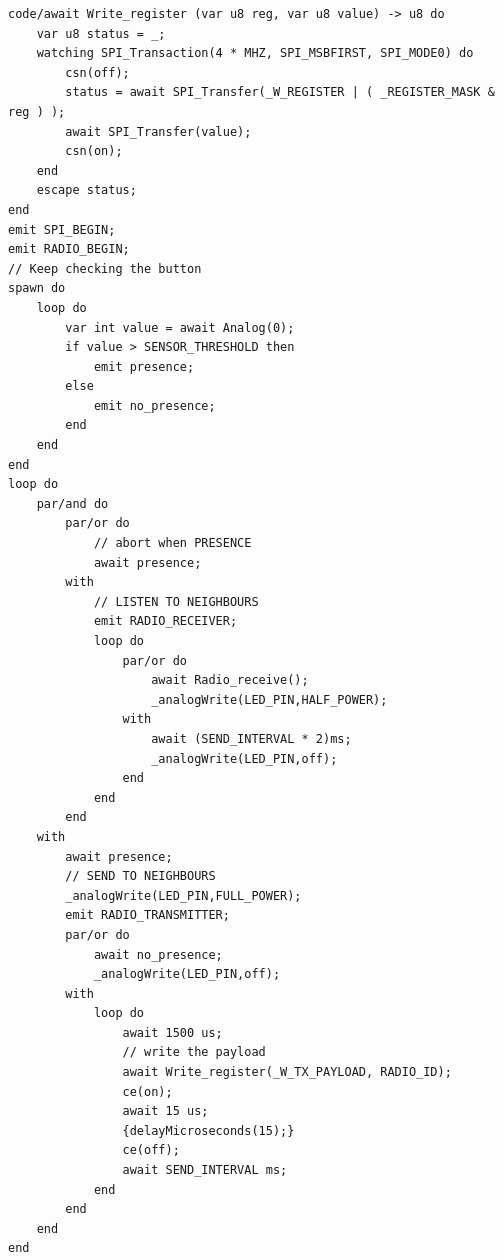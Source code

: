 \documentclass[11pt]{article}
\begin{document}
\begin{lstlisting}[style=CStyle,label=spi-ceu-abstraction-final,caption=Aplicação utilizando driver SPI em Céu com abstrações]
code/await Write_register (var u8 reg, var u8 value) -> u8 do
    var u8 status = _;
    watching SPI_Transaction(4 * MHZ, SPI_MSBFIRST, SPI_MODE0) do
        csn(off);
        status = await SPI_Transfer(_W_REGISTER | ( _REGISTER_MASK & reg ) ); 
        await SPI_Transfer(value);
        csn(on);
    end
    escape status;
end
emit SPI_BEGIN;
emit RADIO_BEGIN;
// Keep checking the button
spawn do
    loop do
        var int value = await Analog(0);
        if value > SENSOR_THRESHOLD then
            emit presence;
        else
            emit no_presence;
        end
    end
end
loop do
    par/and do
        par/or do
            // abort when PRESENCE
            await presence;
        with
            // LISTEN TO NEIGHBOURS
            emit RADIO_RECEIVER;
            loop do
                par/or do
                    await Radio_receive();
                    _analogWrite(LED_PIN,HALF_POWER);
                with
                    await (SEND_INTERVAL * 2)ms;
                    _analogWrite(LED_PIN,off);
                end
            end 
        end 
    with
        await presence;
        // SEND TO NEIGHBOURS
        _analogWrite(LED_PIN,FULL_POWER);
        emit RADIO_TRANSMITTER;
        par/or do
            await no_presence;
            _analogWrite(LED_PIN,off);
        with
            loop do
                await 1500 us;
                // write the payload
                await Write_register(_W_TX_PAYLOAD, RADIO_ID);
                ce(on);
                await 15 us;
                {delayMicroseconds(15);}
                ce(off);
                await SEND_INTERVAL ms;
            end
        end
    end
end
\end{lstlisting}
\end{document}
